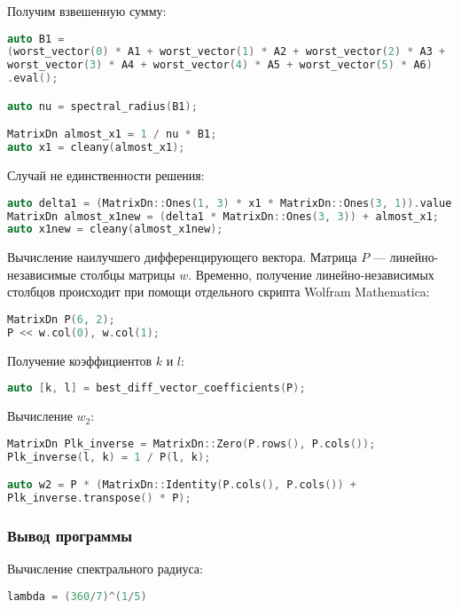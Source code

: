 \documentclass[specialist,
	substylefile = spbu_report.rtx,
	subf,href,colorlinks=true, 12pt]{disser}
\begin{document}
Получим взвешенную сумму:
\begin{lstlisting}[language=c++,basicstyle=\footnotesize\ttfamily]
auto B1 =
(worst_vector(0) * A1 + worst_vector(1) * A2 + worst_vector(2) * A3 +
worst_vector(3) * A4 + worst_vector(4) * A5 + worst_vector(5) * A6)
.eval();

auto nu = spectral_radius(B1);

MatrixDn almost_x1 = 1 / nu * B1;
auto x1 = cleany(almost_x1);
\end{lstlisting}

Случай не единственности решения:
\begin{lstlisting}[language=c++,basicstyle=\footnotesize\ttfamily]
auto delta1 = (MatrixDn::Ones(1, 3) * x1 * MatrixDn::Ones(3, 1)).value();
MatrixDn almost_x1new = (delta1 * MatrixDn::Ones(3, 3)) + almost_x1;
auto x1new = cleany(almost_x1new);
\end{lstlisting}


Вычисление наилучшего дифференцирующего вектора.
Матрица $P$ --- линейно-независимые столбцы матрицы $w$.
Временно, получение линейно-независимых столбцов происходит
при помощи отдельного скрипта Wolfram Mathematica:
\begin{lstlisting}[language=c++,basicstyle=\footnotesize\ttfamily]
MatrixDn P(6, 2);
P << w.col(0), w.col(1);
\end{lstlisting}

Получение коэффициентов $k$ и $l$:
\begin{lstlisting}[language=c++,basicstyle=\footnotesize\ttfamily]
auto [k, l] = best_diff_vector_coefficients(P);
\end{lstlisting}


Вычисление $w_2$:
\begin{lstlisting}[language=c++,basicstyle=\footnotesize\ttfamily]
MatrixDn Plk_inverse = MatrixDn::Zero(P.rows(), P.cols());
Plk_inverse(l, k) = 1 / P(l, k);

auto w2 = P * (MatrixDn::Identity(P.cols(), P.cols()) +
Plk_inverse.transpose() * P);
\end{lstlisting}

\subsubsection{Вывод программы}

Вычисление  спектрального радиуса:
\begin{lstlisting}[language=c++,basicstyle=\footnotesize\ttfamily]
	lambda = (360/7)^(1/5)
\end{lstlisting}
\end{document}
